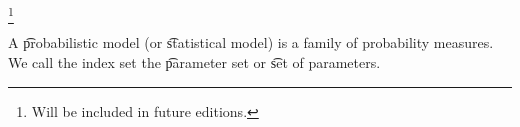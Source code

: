 
\footnote{Will be included in future editions.}


A \t{probabilistic model} (or \t{statistical model}) is a family of probability measures.
We call the index set the \t{parameter set} or \t{set of parameters}.



\blankpage
